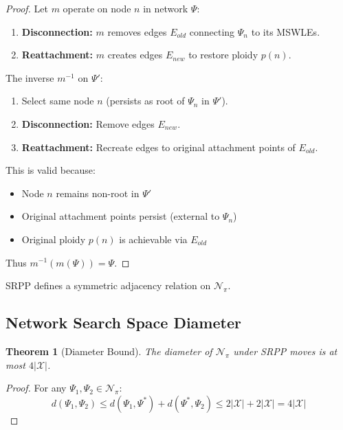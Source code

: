 \documentclass{article}
\newtheorem{theorem}{Theorem}
\begin{document}
\begin{proof}
Let $m$ operate on node $n$ in network $\Psi$:
\begin{enumerate}
    \item \textbf{Disconnection:} $m$ removes edges $E_{old}$ connecting $\Psi_n$ to its MSWLEs.
    \item \textbf{Reattachment:} $m$ creates edges $E_{new}$ to restore ploidy $p(n)$.
\end{enumerate}

The inverse $m^{-1}$ on $\Psi'$:
\begin{enumerate}
    \item Select same node $n$ (persists as root of $\Psi_n$ in $\Psi'$).
    \item \textbf{Disconnection:} Remove edges $E_{new}$.
    \item \textbf{Reattachment:} Recreate edges to original attachment points of $E_{old}$.
\end{enumerate}

This is valid because:
\begin{itemize}
    \item Node $n$ remains non-root in $\Psi'$
    \item Original attachment points persist (external to $\Psi_n$)
    \item Original ploidy $p(n)$ is achievable via $E_{old}$
\end{itemize}

Thus $m^{-1}(m(\Psi)) = \Psi$.
\end{proof}

\begin{corollary}
SRPP defines a symmetric adjacency relation on $\mathcal{N}_\pi$.
\end{corollary}

\subsection{Network Search Space Diameter}

\begin{theorem}[Diameter Bound]\label{thm:diameter}
The diameter of $\mathcal{N}_\pi$ under SRPP moves is at most $4|\mathcal{X}|$.
\end{theorem}

\begin{proof}
For any $\Psi_1, \Psi_2 \in \mathcal{N}_\pi$:
\[
d(\Psi_1, \Psi_2) \leq d(\Psi_1, \Psi^*) + d(\Psi^*, \Psi_2) \leq 2|\mathcal{X}| + 2|\mathcal{X}| = 4|\mathcal{X}|
\]
\end{proof}
\end{document}
